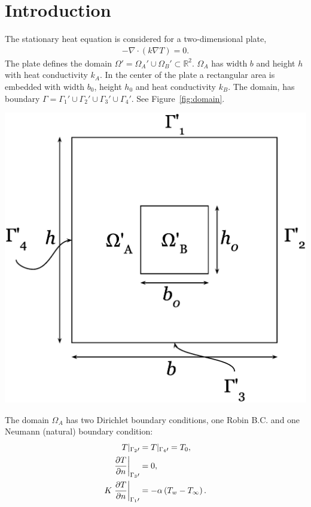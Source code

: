 \section{Introduction}
The stationary heat equation is considered for a two-dimensional plate,
\begin{gather}
    -\nabla\cdot\left(k\nabla T\right)=0.
\end{gather}\label{eq:heat}The plate defines the domain $\Omega\prime= \Omega_A\prime\cup\Omega_B\prime \subset \mathbb{R}^2$. $\Omega_A$ has width $b$ and height $h$ with heat conductivity $k_A$. In the center of the plate a rectangular area is embedded with width $b_0$, height $h_0$ and heat conductivity $k_B$. The domain, has boundary $\Gamma=\Gamma_1\prime\cup\Gamma_2\prime\cup\Gamma_3\prime\cup\Gamma_4\prime$. See Figure~\ref{fig:domain}. 
\begin{Figure}
 \centerfloat
 \includegraphics[width=0.7\linewidth]{domain.eps}
 \label{fig:domain}
\end{Figure}The domain $\Omega_A$ has two Dirichlet boundary conditions, one Robin B.C. and one Neumann (natural) boundary condition: 
\begin{gather*}
\begin{align*}
    T|_{\Gamma_2\prime} &= T\arrowvert_{\Gamma_4\prime} = T_0,\\
    \left.\frac{\partial T}{\partial n}\right|_{\Gamma_3\prime} &= 0,\\
    K\left.\frac{\partial T}{\partial n}\right|_{\Gamma_1\prime} &= -\alpha \left(T_w - T_{\infty}\right).
\end{align*}
\end{gather*}